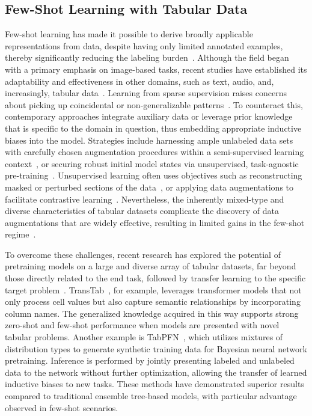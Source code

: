 \subsection{Few-Shot Learning with Tabular Data} Few-shot learning has made it possible to derive broadly applicable representations from data, despite having only limited annotated examples, thereby significantly reducing the labeling burden~\cite{chen2018closer}. Although the field began with a primary emphasis on image-based tasks, recent studies have established its adaptability and effectiveness in other domains, such as text, audio, and, increasingly, tabular data~\cite{majumder2022few,nam2023stunt,schick2021exploiting}. Learning from sparse supervision raises concerns about picking up coincidental or non-generalizable patterns~\cite{bartlett2021deep}. To counteract this, contemporary approaches integrate auxiliary data or leverage prior knowledge that is specific to the domain in question, thus embedding appropriate inductive biases into the model. Strategies include harnessing ample unlabeled data sets with carefully chosen augmentation procedures within a semi-supervised learning context~\cite{ucar2021subtab,yoon2020vime}, or securing robust initial model states via unsupervised, task-agnostic pre-training~\cite{somepalli2021saint}. Unsupervised learning often uses objectives such as reconstructing masked or perturbed sections of the data~\cite{arik2021tabnet,majmundar2022met}, or applying data augmentations to facilitate contrastive learning~\cite{bahri2022scarf,chen2020simple}. Nevertheless, the inherently mixed-type and diverse characteristics of tabular datasets complicate the discovery of data augmentations that are widely effective, resulting in limited gains in the few-shot regime~\cite{nam2023stunt}. 

To overcome these challenges, recent research has explored the potential of pretraining models on a large and diverse array of tabular datasets, far beyond those directly related to the end task, followed by transfer learning to the specific target problem~\cite{zhang2023generative,levin2022transfer,zhu2023xtab}. TransTab~\cite{wang2022transtab}, for example, leverages transformer models that not only process cell values but also capture semantic relationships by incorporating column names. The generalized knowledge acquired in this way supports strong zero-shot and few-shot performance when models are presented with novel tabular problems. Another example is TabPFN~\cite{hollmann2022tabpfn}, which utilizes mixtures of distribution types to generate synthetic training data for Bayesian neural network pretraining. Inference is performed by jointly presenting labeled and unlabeled data to the network without further optimization, allowing the transfer of learned inductive biases to new tasks. These methods have demonstrated superior results compared to traditional ensemble tree-based models, with particular advantage observed in few-shot scenarios.

